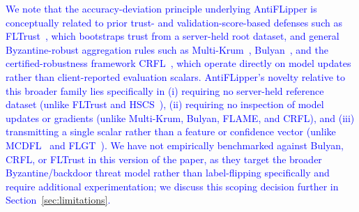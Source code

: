 \documentclass[conference]{IEEEtran}
\begin{document}
\textcolor{blue}{We note that the accuracy-deviation principle underlying AntiFLipper is conceptually related to prior trust- and validation-score-based defenses such as FLTrust~\cite{cao2020fltrust}, which bootstraps trust from a server-held root dataset, and general Byzantine-robust aggregation rules such as Multi-Krum~\cite{NIPS2017_f4b9ec30}, Bulyan~\cite{mhamdi2018hidden}, and the certified-robustness framework CRFL~\cite{xie2021crfl}, which operate directly on model updates rather than client-reported evaluation scalars. AntiFLipper's novelty relative to this broader family lies specifically in (i) requiring no server-held reference dataset (unlike FLTrust and HSCS~\cite{li2023hscs}), (ii) requiring no inspection of model updates or gradients (unlike Multi-Krum, Bulyan, FLAME, and CRFL), and (iii) transmitting a single scalar rather than a feature or confidence vector (unlike MCDFL~\cite{jiang2023dataquality} and FLGT~\cite{li2025flgt}). We have not empirically benchmarked against Bulyan, CRFL, or FLTrust in this version of the paper, as they target the broader Byzantine/backdoor threat model rather than label-flipping specifically and require additional experimentation; we discuss this scoping decision further in Section~\ref{sec:limitations}.}


\end{document}
